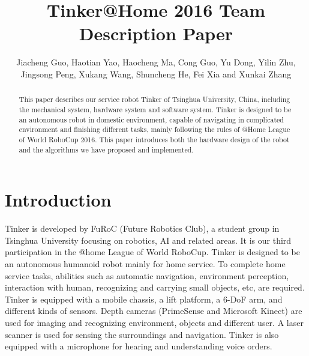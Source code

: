 \documentclass[runningheads,a4paper]{llncs}
\begin{document}
	
\title{Tinker@Home 2016 Team Description Paper}
\author{Jiacheng Guo, Haotian Yao, Haocheng Ma, Cong Guo, Yu Dong, Yilin Zhu, Jingsong Peng, Xukang Wang, Shuncheng He, Fei Xia and Xunkai Zhang}
\maketitle


\begin{abstract}
This paper describes our service robot Tinker of Tsinghua University, China, including the mechanical system, hardware system and software system. Tinker is designed to be an autonomous robot in domestic environment, capable of navigating in complicated environment and finishing different tasks, mainly following the rules of @Home League of World RoboCup 2016. This paper introduces both the hardware design of the robot and the algorithms we have proposed and implemented.
\end{abstract}


\section{Introduction}
Tinker is developed by FuRoC (Future Robotics Club), a student group in Tsinghua University focusing on robotics, AI and related areas. It is our third participation in the @home League of World RoboCup. Tinker is designed to be an autonomous humanoid robot mainly for home service. To complete home service tasks, abilities such as automatic navigation, environment perception, interaction with human, recognizing and carrying small objects, etc, are required. Tinker is equipped with a mobile chassis, a lift platform, a 6-DoF arm, and different kinds of sensors. Depth cameras (PrimeSense and Microsoft Kinect) are used for imaging and recognizing environment, objects and different user. A laser scanner is used for sensing the surroundings and navigation. Tinker is also equipped with a microphone for hearing and understanding voice orders.
\end{document}
